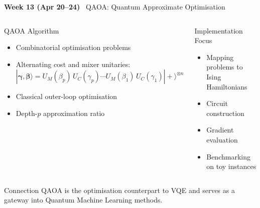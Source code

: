 \documentclass[aspectratio=169,12pt]{beamer}
\newcommand{\ket}[1]{|#1\rangle}
\newcommand{\week}[1]{\textcolor{qgold}{\textbf{#1}}}
\begin{document}
\begin{frame}{\week{Week 13 (Apr 20--24)} \ QAOA: Quantum Approximate Optimisation}
  \begin{columns}[T]
      \begin{block}{QAOA Algorithm}
        \begin{itemize}
          \item Combinatorial optimisation problems
          \item Alternating cost and mixer unitaries:
                \[
                  \ket{\bm\gamma,\bm\beta}
                  = U_M(\beta_p)\,U_C(\gamma_p)\cdots
                    U_M(\beta_1)\,U_C(\gamma_1)\ket{+}^{\otimes n}
                \]
          \item Classical outer-loop optimisation
          \item Depth-$p$ approximation ratio
        \end{itemize}
      \end{block}
      \begin{block}{Implementation Focus}
        \begin{itemize}
          \item Mapping problems to Ising Hamiltonians
          \item Circuit construction
          \item Gradient evaluation
          \item Benchmarking on toy instances
        \end{itemize}
      \end{block}
  \end{columns}
  \vspace{4pt}
  \begin{alertblock}{Connection}
    QAOA is the optimisation counterpart to VQE and serves as
    a gateway into Quantum Machine Learning methods.
  \end{alertblock}
\end{frame}
\end{document}
